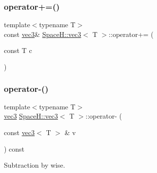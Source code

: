 \mbox{\label{struct_space_h_1_1vec3_a444d5277ca3ad78b88dbba50d45007f1}} 
\subsubsection{\texorpdfstring{operator+=()}{operator+=()}\hspace{0.1cm}{\footnotesize\ttfamily [7/7]}}
{\footnotesize\ttfamily template$<$typename T$>$ \\
const \mbox{\hyperlink{struct_space_h_1_1vec3}{vec3}}\& \mbox{\hyperlink{struct_space_h_1_1vec3}{Space\+H\+::vec3}}$<$ T $>$\+::operator+= (\begin{DoxyParamCaption}\item[{const T}]{c }\end{DoxyParamCaption})\hspace{0.3cm}{\ttfamily [inline]}}

\mbox{\label{struct_space_h_1_1vec3_a8af5f368ccbf70d24d528592acfc6278}} 
\subsubsection{\texorpdfstring{operator-\/()}{operator-()}\hspace{0.1cm}{\footnotesize\ttfamily [1/11]}}
{\footnotesize\ttfamily template$<$typename T$>$ \\
\mbox{\hyperlink{struct_space_h_1_1vec3}{vec3}} \mbox{\hyperlink{struct_space_h_1_1vec3}{Space\+H\+::vec3}}$<$ T $>$\+::operator-\/ (\begin{DoxyParamCaption}\item[{const \mbox{\hyperlink{struct_space_h_1_1vec3}{vec3}}$<$ T $>$ \&}]{v }\end{DoxyParamCaption}) const\hspace{0.3cm}{\ttfamily [inline]}}



Subtraction by wise. 

